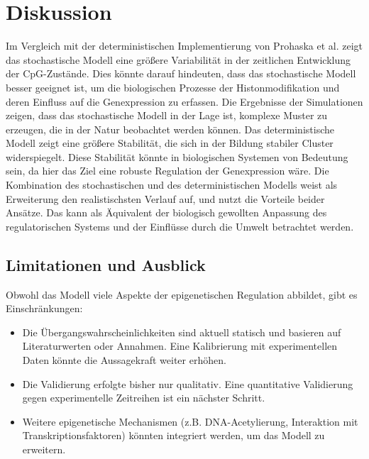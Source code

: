 \documentclass{SeminarV2}
\begin{document}
\section{Diskussion}
Im Vergleich mit der deterministischen Implementierung von Prohaska et al. zeigt das stochastische Modell eine größere Variabilität in der zeitlichen Entwicklung der CpG-Zustände. Dies könnte darauf hindeuten, dass das stochastische Modell besser geeignet ist, um die biologischen Prozesse der Histonmodifikation und deren Einfluss auf die Genexpression zu erfassen. Die Ergebnisse der Simulationen zeigen, dass das stochastische Modell in der Lage ist, komplexe Muster zu erzeugen, die in der Natur beobachtet werden können.
Das deterministische Modell zeigt eine größere Stabilität, die sich in der Bildung stabiler Cluster widerspiegelt. Diese Stabilität könnte in biologischen Systemen von Bedeutung sein, da hier das Ziel eine robuste Regulation der Genexpression wäre.
Die Kombination des stochastischen und des deterministischen Modells weist als Erweiterung den realistischsten Verlauf auf, und nutzt die Vorteile beider Ansätze. 
Das kann als Äquivalent der biologisch gewollten Anpassung des regulatorischen Systems und der Einflüsse durch die Umwelt betrachtet werden.

\subsection{Limitationen und Ausblick}
Obwohl das Modell viele Aspekte der epigenetischen Regulation abbildet, gibt es Einschr\"{a}nkungen:
\begin{itemize}
    \item Die \"{U}bergangswahrscheinlichkeiten sind aktuell statisch und basieren auf Literaturwerten oder Annahmen. Eine Kalibrierung mit experimentellen Daten k\"{o}nnte die Aussagekraft weiter erh\"{o}hen.
    \item Die Validierung erfolgte bisher nur qualitativ. Eine quantitative Validierung gegen experimentelle Zeitreihen ist ein n\"{a}chster Schritt.
    \item Weitere epigenetische Mechanismen (z.B. DNA-Acetylierung, Interaktion mit Transkriptionsfaktoren) k\"{o}nnten integriert werden, um das Modell zu erweitern.
\end{itemize}
\end{document}
